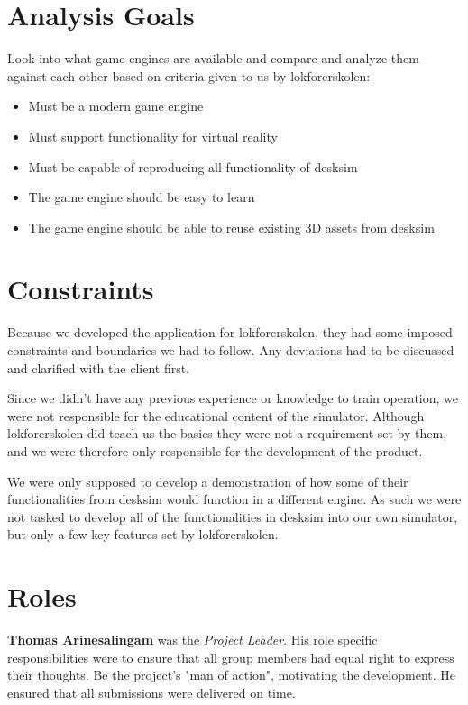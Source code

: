 \section{Analysis Goals}
Look into what game engines are available and compare and analyze them against each other based on criteria given to us by \Gls{lokforerskolen}: 
\begin{itemize}
    \item Must be a modern game engine
    \item Must support functionality for virtual reality
    \item Must be capable of reproducing all functionality of \Gls{desksim}
    \item The game engine should be easy to learn
    \item The game engine should be able to reuse existing 3D assets from \Gls{desksim}
\end{itemize}

\section{Constraints}

Because we developed the application for \Gls{lokforerskolen}, they had some imposed constraints and boundaries we had to follow. Any deviations had to be discussed and clarified with the client first.

Since we didn't have any previous experience or knowledge to train operation, we were not responsible for the educational content of the simulator. Although \Gls{lokforerskolen} did teach us the basics they were not a requirement set by them, and we were therefore only responsible for the development of the product.

We were only supposed to develop a demonstration of how some of their functionalities from \Gls{desksim} would function in a different engine. As such we were not tasked to develop all of the functionalities in \Gls{desksim} into our own simulator, but only a few key features set by \Gls{lokforerskolen}.



\section{Roles}
\textbf{Thomas Arinesalingam} was the \textit{Project Leader}. His role specific responsibilities were to ensure that all group members had equal right to express their thoughts. Be the project's "man of action", motivating the development. He ensured that all submissions were delivered on time. 

